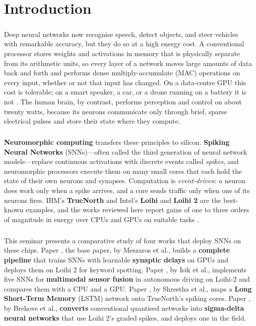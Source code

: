 \documentclass[12pt,a4paper,final]{extreport}
\begin{document}
\setcounter{page}{1}


\chapter{Introduction}

\paragraph{} Deep neural networks now recognise speech, detect objects, and steer vehicles with remarkable accuracy, but they do so at a high energy cost. A conventional processor stores weights and activations in memory that is physically separate from its arithmetic units, so every layer of a network moves large amounts of data back and forth and performs dense multiply-accumulate (MAC) operations on every input, whether or not that input has changed. On a data-centre GPU this cost is tolerable; on a smart speaker, a car, or a drone running on a battery it is not \cite{p2,p4}. The human brain, by contrast, performs perception and control on about twenty watts, because its neurons communicate only through brief, sparse electrical pulses and store their state where they compute.

\paragraph{} \textbf{Neuromorphic computing} transfers these principles to silicon. \textbf{Spiking Neural Networks} (SNNs)---often called the third generation of neural network models---replace continuous activations with discrete events called \emph{spikes}, and neuromorphic processors execute them on many small cores that each hold the state of their own neurons and synapses. Computation is \emph{event-driven}: a neuron does work only when a spike arrives, and a core sends traffic only when one of its neurons fires. IBM's \textbf{TrueNorth} \cite{merolla2014} and Intel's \textbf{Loihi} \cite{davies2018} and \textbf{Loihi 2} \cite{orchard2021} are the best-known examples, and the works reviewed here report gains of one to three orders of magnitude in energy over CPUs and GPUs on suitable tasks \cite{p1,p2,p3,p4}.

\paragraph{} This seminar presents a comparative study of four works that deploy SNNs on these chips. Paper \cite{p1}, the base paper, by Meszaros et al., builds a \textbf{complete pipeline} that trains SNNs with learnable \textbf{synaptic delays} on GPUs and deploys them on Loihi 2 for keyword spotting. Paper \cite{p2}, by Isik et al., implements five SNNs for \textbf{multimodal sensor fusion} in autonomous driving on Loihi-2 and compares them with a CPU and a GPU. Paper \cite{p3}, by Shrestha et al., maps a \textbf{Long Short-Term Memory} (LSTM) network onto TrueNorth's spiking cores. Paper \cite{p4}, by Brehove et al., \textbf{converts} conventional quantised networks into \textbf{sigma-delta neural networks} that use Loihi 2's graded spikes, and deploys one in the field.
\end{document}
